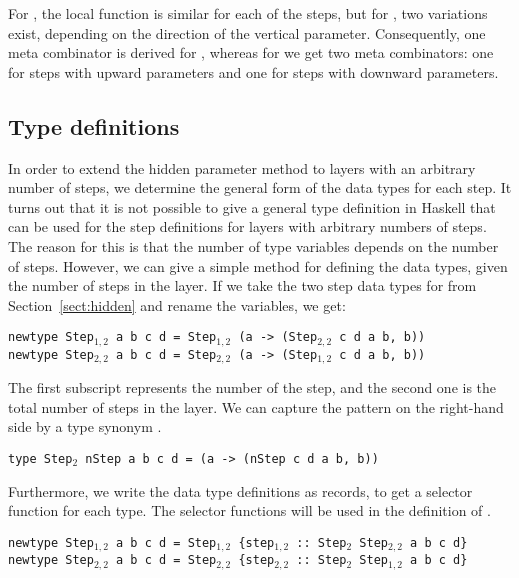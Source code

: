 \bc
 For , the local function is similar for each of the steps, but for , two variations exist, depending on the direction of the vertical parameter. Consequently, one meta combinator is derived for , whereas for  we get two meta combinators: one for steps with upward parameters and one for steps with downward parameters.
\ec
 
 
%																
\subsection{Type definitions} \label{subsecttypedef}

In order to extend the hidden parameter method to layers with an arbitrary number of steps, we determine the general form of the data types for each step. 
\bc
It turns out that it is not possible to give a general type definition in Haskell that can be used for the step definitions for layers with arbitrary numbers of steps. The reason for this is that the number of type variables depends on the number of steps. However, we can give a simple method for defining the data types, given the number of steps in the layer.
\ec
If we take the two step data types for  from Section~\ref{sect:hidden} and rename the variables, we get:

{\tt newtype Step$_{1,2}$ a b c d = Step$_{1,2}$ (a -> (Step$_{2,2}$ c d a b, b))}\\
{\tt newtype Step$_{2,2}$ a b c d = Step$_{2,2}$ (a -> (Step$_{1,2}$ c d a b, b))}

The first subscript represents the number of the step, and the second one is the total number of steps in the layer. We can capture the pattern on the right-hand side by a type synonym .

{\tt type Step$_2$ nStep a b c d = (a -> (nStep c d a b, b))}


Furthermore, we write the data type definitions as records, to get a selector function for each type. The selector functions will be used in the definition of .

{\tt newtype Step$_{1,2}$ a b c d = Step$_{1,2}$ \{step$_{1,2}$}\verb| :: |{\tt Step$_2$ Step$_{2,2}$  a b c d\}}\\
{\tt newtype Step$_{2,2}$ a b c d = Step$_{2,2}$ \{step$_{2,2}$}\verb| :: |{\tt Step$_2$ Step$_{1,2}$  a b c d\}}


